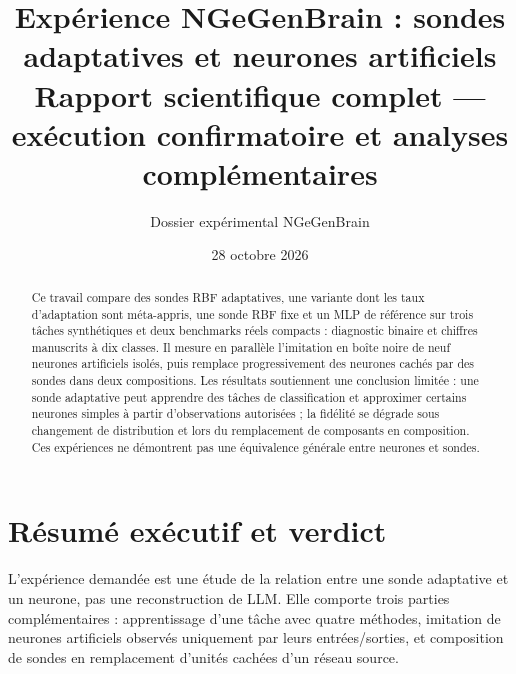 \documentclass[11pt,a4paper]{article}
\title{\vspace{-1cm}\textcolor{blueNG}{\bfseries Expérience NGeGenBrain : sondes adaptatives et neurones artificiels}\\[.2em]\large Rapport scientifique complet — exécution confirmatoire et analyses complémentaires}
\author{Dossier expérimental NGeGenBrain}
\date{28 octobre 2026}
\begin{document}
\maketitle
\begin{abstract}
Ce travail compare des sondes RBF adaptatives, une variante dont les taux d'adaptation sont méta-appris, une sonde RBF fixe et un MLP de référence sur trois tâches synthétiques et deux benchmarks réels compacts : diagnostic binaire et chiffres manuscrits à dix classes. Il mesure en parallèle l'imitation en boîte noire de neuf neurones artificiels isolés, puis remplace progressivement des neurones cachés par des sondes dans deux compositions. Les résultats soutiennent une conclusion limitée : une sonde adaptative peut apprendre des tâches de classification et approximer certains neurones simples à partir d'observations autorisées ; la fidélité se dégrade sous changement de distribution et lors du remplacement de composants en composition. Ces expériences ne démontrent pas une équivalence générale entre neurones et sondes.
\end{abstract}
\tableofcontents\newpage
\section{Résumé exécutif et verdict}
L'expérience demandée est une étude de la relation entre une sonde adaptative et un neurone, pas une reconstruction de LLM. Elle comporte trois parties complémentaires : apprentissage d'une tâche avec quatre méthodes, imitation de neurones artificiels observés uniquement par leurs entrées/sorties, et composition de sondes en remplacement d'unités cachées d'un réseau source.
\end{document}
